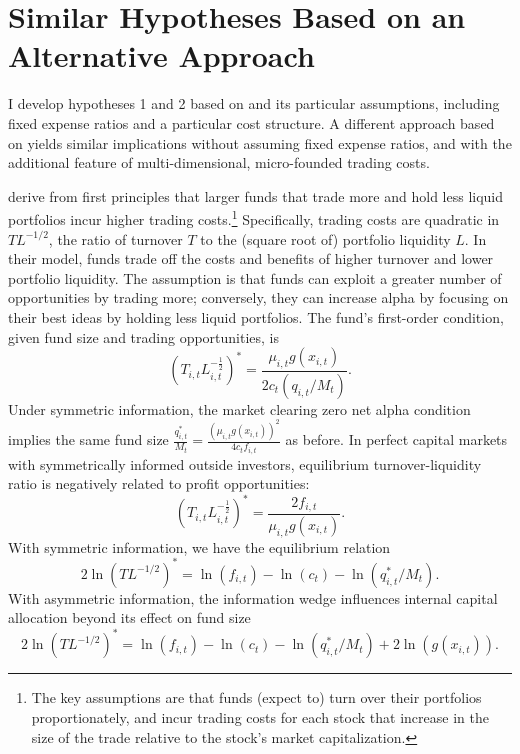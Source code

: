 \documentclass[openany]{book}
\let\rmarkdownfootnote\footnote%
\def\footnote{\protect\rmarkdownfootnote}
\theoremstyle{definition}
\theoremstyle{definition}
\theoremstyle{definition}
\theoremstyle{remark}
\begin{document}
\hypertarget{similar-hypotheses-based-on-an-alternative-approach}{%
\section{Similar Hypotheses Based on an Alternative
Approach}\label{similar-hypotheses-based-on-an-alternative-approach}}

I develop hypotheses 1 and 2 based on \citet{bg04} and its particular
assumptions, including fixed expense ratios and a particular cost
structure. A different approach based on \citet{pst17L} yields similar
implications without assuming fixed expense ratios, and with the
additional feature of multi-dimensional, micro-founded trading costs.

\citet{pst17L} derive from first principles that larger funds that trade
more and hold less liquid portfolios incur higher trading
costs.\footnote{The key assumptions are that funds (expect to) turn over
  their portfolios proportionately, and incur trading costs for each
  stock that increase in the size of the trade relative to the stock's
  market capitalization.} Specifically, trading costs are quadratic in
\(TL^{-1/2}\), the ratio of turnover \(T\) to the (square root of)
portfolio liquidity \(L\). In their model, funds trade off the costs and
benefits of higher turnover and lower portfolio liquidity. The
assumption is that funds can exploit a greater number of opportunities
by trading more; conversely, they can increase alpha by focusing on
their best ideas by holding less liquid portfolios. The fund's
first-order condition, given fund size and trading opportunities, is
\begin{equation}
(T_{i,t}L_{i,t}^{-\frac{1}{2}})^\ast = \frac{\mu_{i,t}g(x_{i,t})}{2c_t(q_{i,t}/M_t)}.
\label{eq:PSTfoc}
\end{equation} Under symmetric information, the market clearing zero net
alpha condition implies the same fund size
\(\frac{q_{i,t}^\ast}{M_t}=\frac{(\mu_{i,t}g(x_{i,t}))^2}{4c_t f_{i,t}}\)
as before. In perfect capital markets with symmetrically informed
outside investors, equilibrium turnover-liquidity ratio is negatively
related to profit opportunities: \begin{equation}
(T_{i,t}L_{i,t}^{-\frac{1}{2}})^\ast=\frac{2f_{i,t}}{\mu_{i,t}g(x_{i,t})}.
\label{eq:PSTcapMkt}
\end{equation} With symmetric information, we have the equilibrium
relation \begin{equation}
2\ln(TL^{-1/2})^\ast=\ln(f_{i,t}) - \ln(c_t) - \ln(q^\ast_{i,t}/M_t).
\label{eq:csEqTL}
\end{equation} With asymmetric information, the information wedge
influences internal capital allocation beyond its effect on fund size
\begin{equation}
2\ln(TL^{-1/2})^\ast=\ln(f_{i,t}) - \ln(c_t) - \ln(q^\ast_{i,t}/M_t)+2\ln(g(x_{i,t})).
\label{eq:csEqaTL}
\end{equation}
\end{document}
